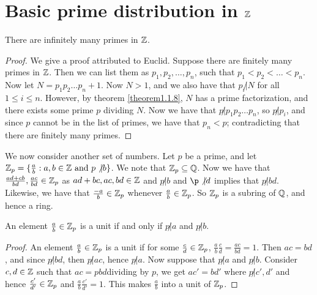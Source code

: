 
\section{Basic prime distribution in $\mathbb{Z}$}
\hspace{10mm}

\begin{theorem}\label{theorem2.1.1}
    There are infinitely many primes in $\mathbb{Z}$.
\end{theorem}
\begin{proof}
    We give a proof attributed to Euclid. Suppose there are finitely many primes in $\mathbb{Z}$. Then we can list them as $p_1,p_2, \dots, p_n$, such that $p_1<p_2< \dots <p_n$. Now let $N=p_1p_2 \dots p_n+1$. Now $N>1$, and we also have that $p_i \not| N$ for all $1 \leq i \leq n$. However, by theorem \ref{theorem1.1.8}, $N$ has a prime factorization, and there exists some prime $p$ dividing $N$. Now we have that $p \not| p_1p_2 \dots p_n$, so $p \not| p_i$, and since $p$ cannot be in the list of primes, we have that $p_n<p$; contradicting that there are finitely many primes.   
\end{proof}

We now consider another set of numbers. Let $p$ be a prime, and let $\mathbb{Z}_p=\{\frac{a}{b}: a,b \in \mathbb{Z} \text{ and } p \not|b\}$. We note that $\mathbb{Z}_p \subseteq \mathbb{Q}$. Now we have that $\frac{ad+cb}{bd},\frac{ac}{bd} \in \mathbb{Z}_p$ as $ad+bc,ac,bd \in \mathbb{Z}$ and $p \not| b$ and $\p \not| d$ implies that $p \not| bd$. Likewise, we have that $\frac{-a}{b} \in \mathbb{Z}_p$ whenever $\frac{a}{b} \in \mathbb{Z}_p$. So $\mathbb{Z}_p$ is a subring of $\mathbb{Q}$, and hence a ring.

\begin{lemma}\label{lemma2.1.2}
    An element $\frac{a}{b} \in \mathbb{Z}_p$ is a unit if and only if $p \not|a$ and $p \not| b$.
\end{lemma}
\begin{proof}
    An element $\frac{a}{b} \in \mathbb{Z}_p$ is a unit if for some $\frac{c}{d} \in \mathbb{Z}_p$, $\frac{a}{b}\frac{c}{d}=\frac{ac}{bd}=1$. Then $ac=bd$, and since $p \not| bd$, then $p \not|ac$, hence $p \not| a$. Now suppose that $p \not| a$ and $p \not| b$. Consider $c,d \in \mathbb{Z}$ such that $ac=pbd$dividing by $p$, we get $ac'=bd'$ where $p \not|c',d'$ and hence $\frac{c'}{d'} \in \mathbb{Z}_p$ and $\frac{a}{b}\frac{c'}{d'}=1$. This makes $\frac{a}{b}$ into a unit of $\mathbb{Z}_p$. 
\end{proof}

